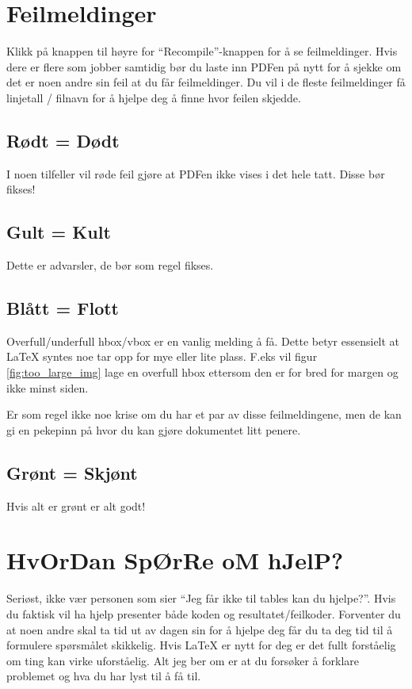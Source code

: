     
    
\section{Feilmeldinger}
    Klikk på knappen til høyre for ``Recompile''-knappen for å se feilmeldinger. 
        Hvis dere er flere som jobber samtidig bør du laste inn PDFen på nytt for å sjekke om det er noen andre sin feil at du får feilmeldinger.
        Du vil i de fleste feilmeldinger få linjetall / filnavn for å hjelpe deg å finne hvor feilen skjedde.
    \subsection{Rødt = Dødt}
        I noen tilfeller vil røde feil gjøre at PDFen ikke vises i det hele tatt. Disse bør fikses!
    \subsection{Gult = Kult}
        Dette er advarsler, de bør som regel fikses. 
    \subsection{Blått = Flott}
        Overfull/underfull hbox/vbox er en vanlig melding å få. Dette betyr essensielt at \LaTeX\vspace{1pt} syntes noe tar opp for mye eller lite plass. F.eks vil figur \ref{fig:too_large_img} lage en overfull hbox ettersom den er for bred for margen og ikke minst siden. 
        
        Er som regel ikke noe krise om du har et par av disse feilmeldingene, men de kan gi en pekepinn på hvor du kan gjøre dokumentet litt penere.
    \subsection{Grønt = Skjønt}
        Hvis alt er grønt er alt godt!



\section{HvOrDan SpØrRe oM hJelP?}
    Seriøst, ikke vær personen som sier ``Jeg får ikke til tables kan du hjelpe?''. 
    Hvis du faktisk vil ha hjelp presenter både koden og resultatet/feilkoder.
    Forventer du at noen andre skal ta tid ut av dagen sin for å hjelpe deg får du ta deg tid til å formulere spørsmålet skikkelig. Hvis \LaTeX\hspace{1pt} er nytt for deg er det fullt forståelig om ting kan virke uforståelig. Alt jeg ber om er at du forsøker å forklare problemet og hva du har lyst til å få til.
    

